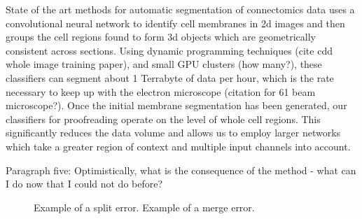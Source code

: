 State of the art methods for automatic segmentation of connectomics data uses a convolutional neural network to identify cell membranes in 2d images and then groups the cell regions found to form 3d objects which are geometrically consistent across sections. Using dynamic programming techniques (cite cdd whole image training paper), and small GPU clusters (how many?), these classifiers can segment about 1 Terrabyte of data per hour, which is the rate necessary to keep up with the electron microscope (citation for 61 beam microscope?). Once the initial membrane segmentation has been generated, our classifiers for proofreading operate on the level of whole cell regions. This significantly reduces the data volume and allows us to employ larger networks which take a greater region of context and multiple input channels into account. 

Paragraph five: Optimistically, what is the consequence of the method - what can I do now that I could not do before?

\begin{figure}
\caption{Example of a split error. Example of a merge error.}
\end{figure}
